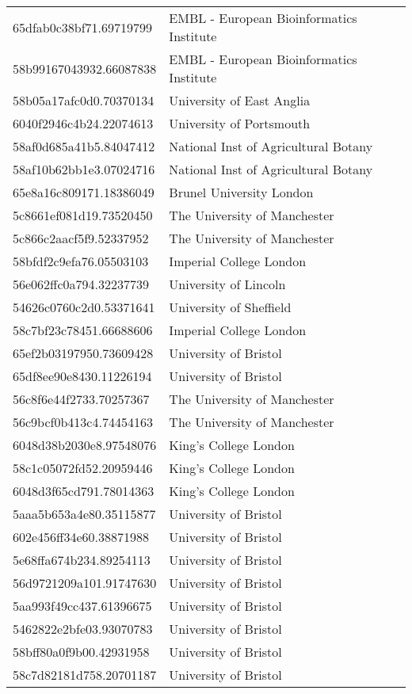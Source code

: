 \begin{tabular}{ll}
65dfab0c38bf71.69719799 & EMBL - European Bioinformatics Institute \\
58b99167043932.66087838 & EMBL - European Bioinformatics Institute \\
58b05a17afc0d0.70370134 & University of East Anglia \\
6040f2946c4b24.22074613 & University of Portsmouth \\
58af0d685a41b5.84047412 & National Inst of Agricultural Botany \\
58af10b62bb1e3.07024716 & National Inst of Agricultural Botany \\
65e8a16c809171.18386049 & Brunel University London \\
5c8661ef081d19.73520450 & The University of Manchester \\
5c866c2aacf5f9.52337952 & The University of Manchester \\
58bfdf2c9efa76.05503103 & Imperial College London \\
56e062ffc0a794.32237739 & University of Lincoln \\
54626c0760c2d0.53371641 & University of Sheffield \\
58c7bf23c78451.66688606 & Imperial College London \\
65ef2b03197950.73609428 & University of Bristol \\
65df8ee90e8430.11226194 & University of Bristol \\
56c8f6e44f2733.70257367 & The University of Manchester \\
56c9bcf0b413c4.74454163 & The University of Manchester \\
6048d38b2030e8.97548076 & King's College London \\
58c1c05072fd52.20959446 & King's College London \\
6048d3f65cd791.78014363 & King's College London \\
5aaa5b653a4e80.35115877 & University of Bristol \\
602e456ff34e60.38871988 & University of Bristol \\
5e68ffa674b234.89254113 & University of Bristol \\
56d9721209a101.91747630 & University of Bristol \\
5aa993f49cc437.61396675 & University of Bristol \\
5462822e2bfe03.93070783 & University of Bristol \\
58bff80a0f9b00.42931958 & University of Bristol \\
58c7d82181d758.20701187 & University of Bristol \\

\end{tabular}
